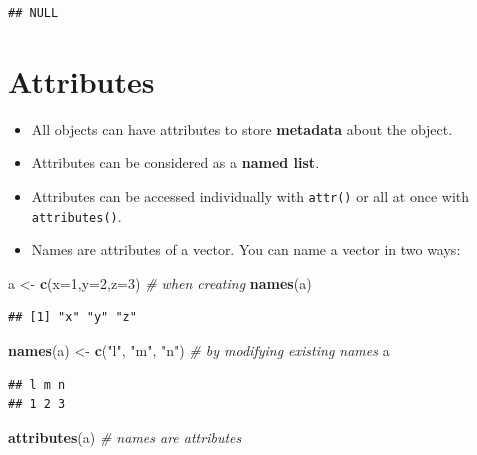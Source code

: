 \documentclass[]{book}
\newenvironment{Shaded}{\begin{snugshade}}{\end{snugshade}}
\newcommand{\KeywordTok}[1]{\textcolor[rgb]{0.13,0.29,0.53}{\textbf{{#1}}}}
\newcommand{\DataTypeTok}[1]{\textcolor[rgb]{0.13,0.29,0.53}{{#1}}}
\newcommand{\DecValTok}[1]{\textcolor[rgb]{0.00,0.00,0.81}{{#1}}}
\newcommand{\StringTok}[1]{\textcolor[rgb]{0.31,0.60,0.02}{{#1}}}
\newcommand{\CommentTok}[1]{\textcolor[rgb]{0.56,0.35,0.01}{\textit{{#1}}}}
\newcommand{\NormalTok}[1]{{#1}}
\providecommand{\tightlist}{%
  \setlength{\itemsep}{0pt}\setlength{\parskip}{0pt}}
\begin{document}
\begin{verbatim}
## NULL
\end{verbatim}

\section{Attributes}\label{attributes}

\begin{itemize}
\tightlist
\item
  All objects can have attributes to store \textbf{metadata} about the
  object.
\item
  Attributes can be considered as a \textbf{named list}.
\item
  Attributes can be accessed individually with \texttt{attr()} or all at
  once with \texttt{attributes()}.
\item
  Names are attributes of a vector. You can name a vector in two ways:
\end{itemize}

\begin{Shaded}
\begin{Highlighting}[]
\NormalTok{a <-}\StringTok{ }\KeywordTok{c}\NormalTok{(}\DataTypeTok{x=}\DecValTok{1}\NormalTok{,}\DataTypeTok{y=}\DecValTok{2}\NormalTok{,}\DataTypeTok{z=}\DecValTok{3}\NormalTok{)   }\CommentTok{# when creating}
\KeywordTok{names}\NormalTok{(a)}
\end{Highlighting}
\end{Shaded}

\begin{verbatim}
## [1] "x" "y" "z"
\end{verbatim}

\begin{Shaded}
\begin{Highlighting}[]
\KeywordTok{names}\NormalTok{(a) <-}\StringTok{ }\KeywordTok{c}\NormalTok{(}\StringTok{"l"}\NormalTok{, }\StringTok{"m"}\NormalTok{, }\StringTok{"n"}\NormalTok{)   }\CommentTok{# by modifying existing names}
\NormalTok{a}
\end{Highlighting}
\end{Shaded}

\begin{verbatim}
## l m n 
## 1 2 3
\end{verbatim}

\begin{Shaded}
\begin{Highlighting}[]
\KeywordTok{attributes}\NormalTok{(a)    }\CommentTok{# names are attributes}
\end{Highlighting}
\end{Shaded}
\end{document}
